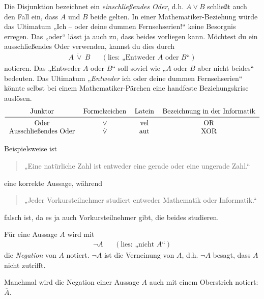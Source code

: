 	
\begin{bem} \label{entwederoder}
    Die Disjunktion bezeichnet ein \emph{einschließendes Oder}, d.h. $A\lor B$ schließt auch den Fall ein, dass $A$ und $B$ beide gelten. In einer Mathematiker-Beziehung würde das Ultimatum „Ich -- oder deine dummen Fernsehserien!“ keine Besorgnis erregen. Das „oder“ lässt ja auch zu, dass beides vorliegen kann. Möchtest du ein ausschließendes Oder verwenden, kannst du dies durch
    \begin{align*}
        A\ \dot\lor\ B && (\text{lies: „Entweder $A$ oder $B$“})
    \end{align*}
    notieren. Das „Entweder $A$ oder $B$“ soll soviel wie „$A$ oder $B$ aber nicht beides“ bedeuten. Das Ultimatum „\emph{Entweder} ich oder deine dummen Fernsehserien“ könnte selbst bei einem Mathematiker-Pärchen eine handfeste Beziehungskrise auslösen.
    \[\begin{tabular}{cccc}
        Junktor &  Formelzeichen & Latein & Bezeichnung in der Informatik \\
        \midrule
        Oder &  $\lor$ & vel & OR \\
        Ausschließendes Oder & $\dot\lor$ & aut & XOR
    \end{tabular}\]
\end{bem}


\begin{bsp}
    Beispielsweise ist
    \begin{quote}
        „Eine natürliche Zahl ist entweder eine gerade oder eine ungerade Zahl.“
    \end{quote}
    eine korrekte Aussage, während
    \begin{quote}
        „Jeder Vorkursteilnehmer studiert entweder Mathematik oder Informatik.“
    \end{quote}
    falsch ist, da es ja auch Vorkursteilnehmer gibt, die beides studieren.
\end{bsp}


\begin{de}[Negation] 
    Für eine Aussage $A$ wird mit
    \begin{align*}
        \neg A   && (\text{lies: „nicht $A$“})
    \end{align*}
    die \emph{Negation} von $A$ notiert. $\neg A$ ist die Verneinung von $A$, d.h. $\neg A$ besagt, dass $A$ nicht zutrifft.
    
    Manchmal wird die Negation einer Aussage $A$ auch mit einem Oberstrich notiert: $\overline{A}$.
\end{de}


